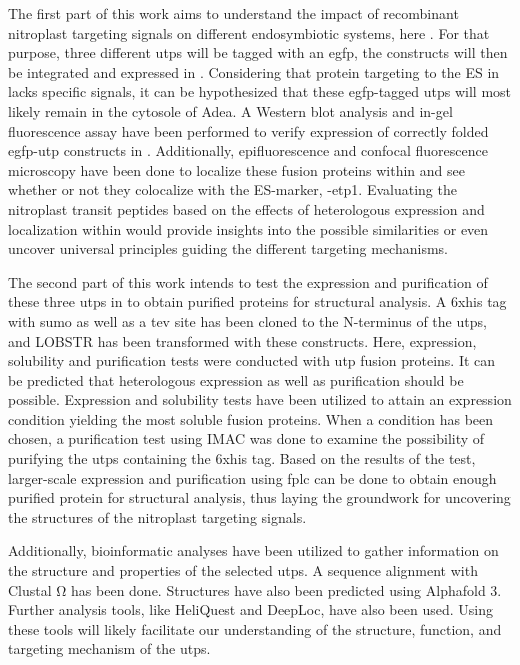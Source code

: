 \par The first part of this work aims to understand the impact of recombinant nitroplast targeting signals on different endosymbiotic systems, here . For that purpose, three different \gls{utp}s will be tagged with an \gls{egfp}, the constructs will then be integrated and expressed in . Considering that protein targeting to the \gls{ES} in  lacks specific signals, it can be hypothesized that these \gls{egfp}-tagged \gls{utp}s  will most likely remain in the cytosole of \gls{Adea}. A Western blot analysis and in-gel fluorescence assay have been performed to verify expression of correctly folded \gls{egfp}-\gls{utp} constructs in . Additionally, epifluorescence and confocal fluorescence microscopy have been done to localize these fusion proteins within  and see whether or not they colocalize with the \gls{ES}-marker, -\gls{etp}1. Evaluating the nitroplast transit peptides based on the effects of heterologous expression and localization within  would provide insights into the possible similarities or even uncover universal principles guiding the different targeting mechanisms.

\par The second part of this work intends to test the expression and purification of these three \gls{utp}s in  to obtain purified proteins for structural analysis. A \gls{6xhis} tag with \gls{sumo} as well as a \gls{tev site} has been cloned to the N-terminus of the \gls{utp}s, and  LOBSTR has been transformed with these constructs. Here, expression, solubility and purification tests were conducted with \gls{utp} fusion proteins. It can be predicted that heterologous expression as well as purification should be possible. Expression and solubility tests have been utilized to attain an expression condition yielding the most soluble fusion proteins. When a condition has been chosen, a purification test using \gls{IMAC} was done to examine the possibility of purifying the \gls{utp}s containing the \gls{6xhis} tag. Based on the results of the test, larger-scale expression and purification using \gls{fplc} can be done to obtain enough purified protein for structural analysis, thus laying the groundwork for uncovering the structures of the nitroplast targeting signals.

\par Additionally, bioinformatic analyses have been utilized to gather information on the structure and properties of the selected \gls{utp}s. A sequence alignment with Clustal Ω has been done. Structures have also been predicted using Alphafold 3. Further analysis tools, like HeliQuest and DeepLoc, have also been used. Using these tools will likely facilitate our understanding of the structure, function, and targeting mechanism of the \gls{utp}s. 
